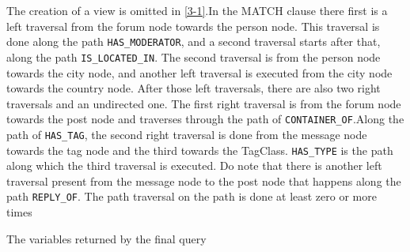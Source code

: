 
The creation of a view is omitted in \ref{3-1}.In the MATCH clause there first is a left traversal from the 
 forum node towards the person node. This traversal is done along the path \texttt{HAS\_MODERATOR}, and a second traversal starts after that, along the path
 \texttt{IS\_LOCATED\_IN}. The second traversal is from the person node towards the city node, and another left traversal is executed 
 from the city node towards the country node. After those left traversals, there are also two right traversals and an undirected one.
 The first right traversal is from the forum node towards the post node and traverses through the path of 
 \texttt{CONTAINER\_OF}.Along the path of \texttt{HAS\_TAG}, the second right traversal is done from the message node towards the tag node and the third towards the TagClass. \texttt{HAS\_TYPE} is the path along which the third traversal is executed.
 Do note that there is another left traversal present from the message node to the post node that happens along the path \texttt{REPLY\_OF}. The path traversal on the path is done at least zero or more times 
 
 The variables returned by the final query 
 
